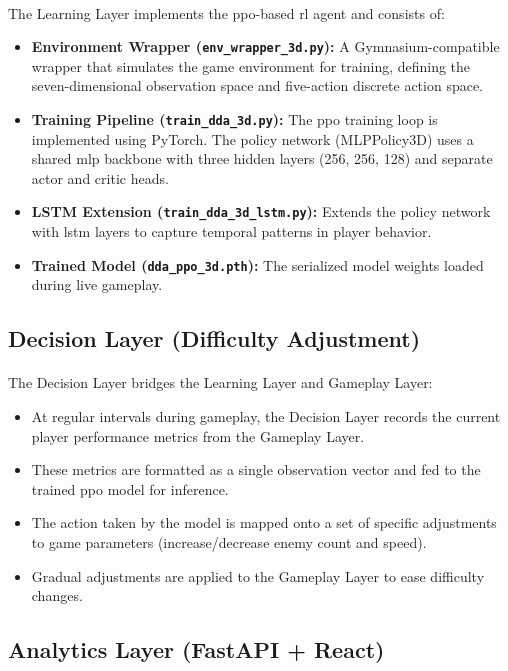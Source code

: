 \paragraph{} The Learning Layer implements the \ac{ppo}-based \ac{rl} agent and consists of:
\begin{itemize}
	\item \textbf{Environment Wrapper (\texttt{env\_wrapper\_3d.py}):} A Gymnasium-compatible wrapper that simulates the game environment for training, defining the seven-dimensional observation space and five-action discrete action space.
	\item \textbf{Training Pipeline (\texttt{train\_dda\_3d.py}):} The \ac{ppo} training loop is implemented using PyTorch. The policy network (MLPPolicy3D) uses a shared \ac{mlp} backbone with three hidden layers (256, 256, 128) and separate actor and critic heads.
	\item \textbf{LSTM Extension (\texttt{train\_dda\_3d\_lstm.py}):} Extends the policy network with \ac{lstm} layers to capture temporal patterns in player behavior.
	\item \textbf{Trained Model (\texttt{dda\_ppo\_3d.pth}):} The serialized model weights loaded during live gameplay.
\end{itemize}

\subsection{Decision Layer (Difficulty Adjustment)}
\paragraph{} The Decision Layer bridges the Learning Layer and Gameplay Layer:
\begin{itemize}
	\item At regular intervals during gameplay, the Decision Layer records the current player performance metrics from the Gameplay Layer.
	\item These metrics are formatted as a single observation vector and fed to the trained \ac{ppo} model for inference.
	\item The action taken by the model is mapped onto a set of specific adjustments to game parameters (increase/decrease enemy count and speed).
	\item Gradual adjustments are applied to the Gameplay Layer to ease difficulty changes.
\end{itemize}

\subsection{Analytics Layer (FastAPI + React)}
